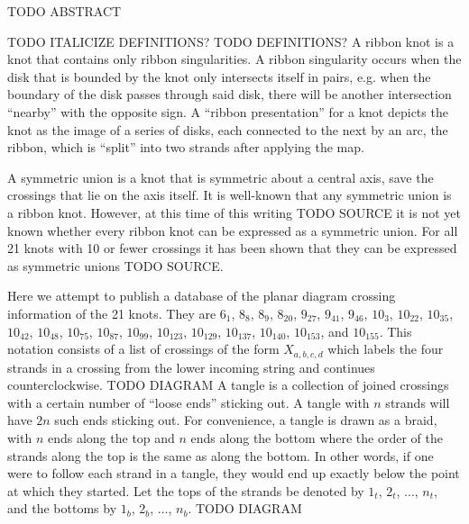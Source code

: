 

\begin{paperabstract}
TODO ABSTRACT
\end{paperabstract}
\begin{paper}
\theorems
TODO ITALICIZE DEFINITIONS?
TODO DEFINITIONS?
A ribbon knot is a knot that contains only ribbon singularities.
A ribbon singularity occurs when the disk that is bounded by the knot only
intersects itself in pairs, e.g. when the boundary of the disk passes through
said disk, there will be another intersection ``nearby'' with the opposite sign.
A ``ribbon presentation'' for a knot depicts the knot as the image of a series
of disks, each connected to the next by an arc, the ribbon, which is ``split''
into two strands after applying the map.

A symmetric union is a knot that is symmetric about a central axis, save the
crossings that lie on the axis itself.
It is well-known that any symmetric union is a ribbon knot.
However, at this time of this writing TODO SOURCE it is not yet known whether
every ribbon knot can be expressed as a symmetric union.
For all 21 knots with 10 or fewer crossings it has been shown that they can be
expressed as symmetric unions TODO SOURCE.

Here we attempt to publish a database of the planar diagram crossing information
of the 21 knots.
They are $6_1$, $8_8$, $8_9$, $8_{20}$, $9_{27}$, $9_{41}$, $9_{46}$, $10_3$,
$10_{22}$, $10_{35}$, $10_{42}$, $10_{48}$, $10_{75}$, $10_{87}$, $10_{99}$,
$10_{123}$, $10_{129}$, $10_{137}$, $10_{140}$, $10_{153}$, and $10_{155}$.
This notation consists of a list of crossings of the form $X_{a,b,c,d}$ which
labels the four strands in a crossing from the lower incoming string and
continues counterclockwise.
TODO DIAGRAM
A tangle is a collection of joined crossings with a certain number of ``loose
ends'' sticking out.
A tangle with $n$ strands will have $2n$ such ends sticking out.
For convenience, a tangle is drawn as a braid, with $n$ ends along the top and
$n$ ends along the bottom where the order of the strands along the top is the
same as along the bottom.
In other words, if one were to follow each strand in a tangle, they would end up
exactly below the point at which they started.
Let the tops of the strands be denoted by $1_t$, $2_t$, ..., $n_t$, and the
bottoms  by $1_b$, $2_b$, ..., $n_b$.
TODO DIAGRAM


\end{paper}
